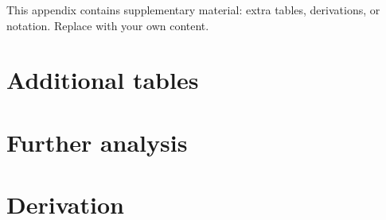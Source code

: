 %

This appendix contains supplementary material: extra tables, derivations, or notation. Replace with your own content.

\section{Additional tables}\label{app:tables}

\lipsum[47-48]

\section{Further analysis}\label{app:analysis}

\lipsum[49-50]

\section{Derivation}\label{app:derivation}

\lipsum[51-52]
